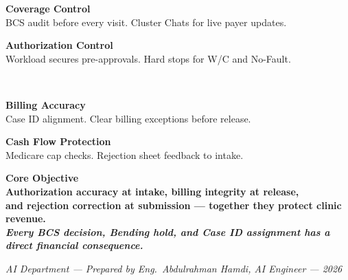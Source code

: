\documentclass[11pt,a4paper]{article}
\begin{document}
\vspace{0.5em}
\begin{center}
\begin{minipage}[t]{0.47\linewidth}
  \begin{tcolorbox}[metricbox]
    \textbf{\color{AccentTeal}Coverage Control}\\[0.3em]
    BCS audit before every visit. Cluster Chats for live payer updates.
  \end{tcolorbox}
\end{minipage}\hfill
\begin{minipage}[t]{0.47\linewidth}
  \begin{tcolorbox}[metricbox]
    \textbf{\color{AccentTeal}Authorization Control}\\[0.3em]
    Workload secures pre-approvals. Hard stops for W/C and No-Fault.
  \end{tcolorbox}
\end{minipage}\\[0.5em]
\begin{minipage}[t]{0.47\linewidth}
  \begin{tcolorbox}[metricbox]
    \textbf{\color{AccentTeal}Billing Accuracy}\\[0.3em]
    Case ID alignment. Clear billing exceptions before release.
  \end{tcolorbox}
\end{minipage}\hfill
\begin{minipage}[t]{0.47\linewidth}
  \begin{tcolorbox}[metricbox]
    \textbf{\color{AccentTeal}Cash Flow Protection}\\[0.3em]
    Medicare cap checks. Rejection sheet feedback to intake.
  \end{tcolorbox}
\end{minipage}
\end{center}

\vspace{1.0em}
\begin{tcolorbox}[enhanced,colback=PrimaryBlue,colframe=AccentGold,
    boxrule=2pt,arc=6pt,left=12pt,right=12pt,top=10pt,bottom=10pt]
  \begin{center}
    \color{white}\large\bfseries Core Objective\\[0.5em]
    \color{SoftBlue}\normalsize
    Authorization accuracy at intake, billing integrity at release,\\
    and rejection correction at submission --- together they protect clinic revenue.\\[0.5em]
    \color{AccentGold}\small\textit{Every BCS decision, Bending hold, and Case ID assignment
    has a direct financial consequence.}
  \end{center}
\end{tcolorbox}

\vspace{0.6em}
\begin{center}
  \color{MidGray}\small
  \textit{AI Department --- Prepared by Eng.\ Abdulrahman Hamdi, AI Engineer --- 2026}
\end{center}
\end{document}
